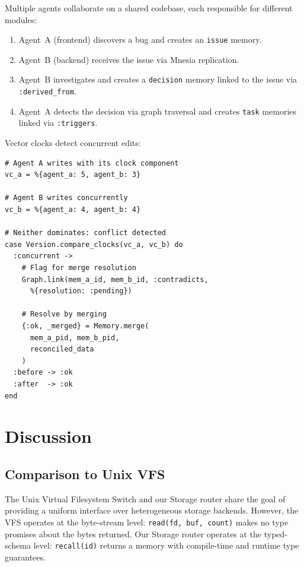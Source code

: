 \documentclass[12pt,a4paper]{article}
\theoremstyle{definition}
\begin{document}
Multiple agents collaborate on a shared codebase, each responsible for different modules:

\begin{enumerate}
  \item Agent~A (frontend) discovers a bug and creates an \texttt{issue} memory.
  \item Agent~B (backend) receives the issue via Mnesia replication.
  \item Agent~B investigates and creates a \texttt{decision} memory linked to the issue via \texttt{:derived\_from}.
  \item Agent~A detects the decision via graph traversal and creates \texttt{task} memories linked via \texttt{:triggers}.
\end{enumerate}

Vector clocks detect concurrent edits:

\begin{lstlisting}[caption={Multi-agent conflict detection via vector clocks.}, label={lst:case-multi}]
# Agent A writes with its clock component
vc_a = %{agent_a: 5, agent_b: 3}

# Agent B writes concurrently
vc_b = %{agent_a: 4, agent_b: 4}

# Neither dominates: conflict detected
case Version.compare_clocks(vc_a, vc_b) do
  :concurrent ->
    # Flag for merge resolution
    Graph.link(mem_a_id, mem_b_id, :contradicts,
      %{resolution: :pending})

    # Resolve by merging
    {:ok, _merged} = Memory.merge(
      mem_a_pid, mem_b_pid,
      reconciled_data
    )
  :before -> :ok
  :after  -> :ok
end
\end{lstlisting}

\section{Discussion}\label{sec:discussion}

\subsection{Comparison to Unix VFS}\label{subsec:unix-vfs}

The Unix Virtual Filesystem Switch and our Storage router share the goal of providing a uniform interface over heterogeneous storage backends.
However, the VFS operates at the byte-stream level: \texttt{read(fd, buf, count)} makes no type promises about the bytes returned.
Our Storage router operates at the typed-schema level: \texttt{recall(id)} returns a memory with compile-time and runtime type guarantees.
\end{document}
